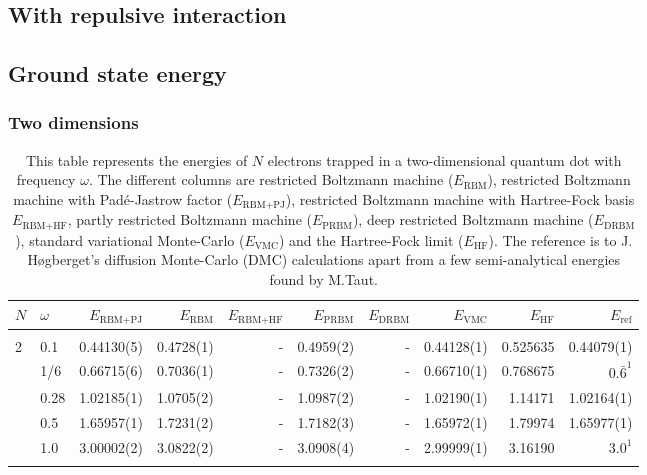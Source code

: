 \begin{landscape}
\section{With repulsive interaction}
\subsection{Ground state energy}
\subsubsection{Two dimensions}
\begin{table} [H]
	\caption{This table represents the energies of $N$ electrons trapped in a two-dimensional quantum dot with frequency $\omega$. The different columns are restricted Boltzmann machine ($E_{\text{RBM}}$), restricted Boltzmann machine with Padé-Jastrow factor ($E_{\text{RBM+PJ}}$), restricted Boltzmann machine with Hartree-Fock basis $E_{\text{RBM+HF}}$, partly restricted Boltzmann machine ($E_{\text{PRBM}}$), deep restricted Boltzmann machine ($E_{\text{DRBM}}$), standard variational Monte-Carlo ($E_{\text{VMC}}$) and the Hartree-Fock limit ($E_{\text{HF}}$). The reference is to J. Høgberget's diffusion Monte-Carlo (DMC) calculations apart from a few semi-analytical energies found by M.Taut. \cite{taut_two_1994}\cite{hogberget_quantum_2013}}
	\begin{tabularx}{\hsize}{l:l|RRRRRRRR} \hline\hline
		\label{tab:quantumdotswinteraction2D1}
		$N$ & $\omega$ & $E_{\text{RBM+PJ}}$ & $E_{\text{RBM}}$ & $E_{\text{RBM+HF}}$ & $E_{\text{PRBM}}$ & $E_{\text{DRBM}}$ & $E_{\text{VMC}}$ & $E_{\text{HF}}$ & $E_{\text{ref}}$ \\ \hline \\
		2 & 0.1 & 0.44130(5) & 0.4728(1) & - & 0.4959(2) & - & 0.44128(1) & 0.525635 & 0.44079(1) \\ 
		& 1/6 & 0.66715(6) & 0.7036(1) & - & 0.7326(2) & - & 0.66710(1) & 0.768675 & $0.\bar{6}^{1}$ \\
		& 0.28 & 1.02185(1) & 1.0705(2) & - & 1.0987(2) & - & 1.02190(1) & 1.14171 & 1.02164(1) \\
		& 0.5 & 1.65957(1) & 1.7231(2) & - & 1.7182(3) & - & 1.65972(1) & 1.79974 & 1.65977(1)  \\
		& 1.0 & 3.00002(2) & 3.0822(2) & - & 3.0908(4) & - & 2.99999(1) & 3.16190 & $3.0^{1}$ \\ \hdashline \\


\end{tabularx}
\end{table}
\end{landscape}
